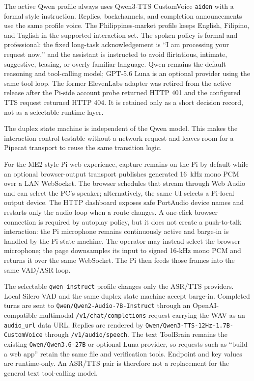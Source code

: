 \documentclass[sigconf,nonacm,balance=false]{acmart}
\begin{document}
The active Qwen profile always uses Qwen3-TTS CustomVoice \texttt{aiden} with a formal style
instruction. Replies, backchannels, and
completion announcements use the same profile voice. The Philippines-market
profile keeps English, Filipino, and Taglish in the supported interaction set.
The spoken policy is formal and professional: the fixed long-task acknowledgement
is ``I am processing your request now,'' and the assistant is instructed to
avoid flirtatious, intimate, suggestive, teasing, or overly familiar language.
Qwen remains the default reasoning and tool-calling model; GPT-5.6 Luna is an
optional provider using the same tool loop. The former ElevenLabs adapter was
retired from the active release after the Pi-side account probe returned HTTP
401 and the configured TTS request returned HTTP 404. It is retained only as a
short decision record, not as a selectable runtime layer.

The duplex state machine is independent of the Qwen model. This makes the
interaction control testable without a network request and leaves room for a
Pipecat transport to reuse the same transition logic.

For the ME2-style Pi web experience, capture remains on the Pi by default while
an optional browser-output transport publishes generated 16~kHz mono PCM over a
LAN WebSocket. The browser schedules that stream through Web Audio and can
select the PC's speaker; alternatively, the same UI selects a Pi-local output
device. The HTTP dashboard exposes safe PortAudio device names and restarts
only the audio loop when a route changes. A one-click browser connection is
required by autoplay policy, but it does not create a push-to-talk interaction:
the Pi microphone remains continuously active and barge-in is handled by the
Pi state machine. The operator may instead select the browser microphone; the
page downsamples its input to signed 16-kHz mono PCM and returns it over the
same WebSocket. The Pi then feeds those frames into the same VAD/ASR loop.

The selectable \texttt{qwen\_instruct} profile changes only the ASR/TTS
providers. Local Silero VAD and the same duplex state machine accept barge-in.
Completed turns are sent to \texttt{Qwen/Qwen2-Audio-7B-Instruct} through an
OpenAI-compatible multimodal \texttt{/v1/chat/completions} request carrying
the WAV as an \texttt{audio\_url} data URL. Replies are rendered by
\texttt{Qwen/Qwen3-TTS-12Hz-1.7B-CustomVoice} through
\texttt{/v1/audio/speech}. The text ToolBrain remains the existing
\texttt{Qwen/Qwen3.6-27B} or optional Luna provider, so requests such as
``build a web app'' retain the same file and verification tools. Endpoint and
key values are runtime-only. An ASR/TTS pair is therefore not a replacement
for the general text tool-calling model.
\end{document}
